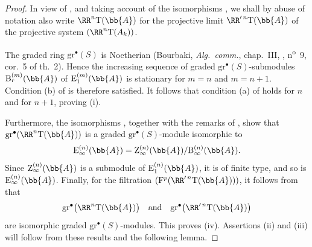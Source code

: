 \begin{proof}
In view of , and taking account of the
isomorphisms , we shall by abuse of notation also
write $\RR^n\mathrm{T}(\bb{A})$ for the projective limit
$\RR'^{\,n}\mathrm{T}(\bb{A})$ of the projective system
$(\RR^n\mathrm{T}(A_k))$.

The graded ring $\mathrm{gr}^\bullet(S)$ is Noetherian
(Bourbaki, \emph{Alg.\ comm.}, chap.~III, ,
n\textsuperscript{o}~9, cor.~5 of th.~2).
Hence the increasing sequence of graded
$\mathrm{gr}^\bullet(S)$-submodules
$\mathrm{B}_r^{(m)}(\bb{A})$ of
$\mathrm{E}_1^{(m)}(\bb{A})$ is stationary for $m=n$ and
$m=n+1$.
Condition {\rm(b)} of  is therefore satisfied.
It follows that condition {\rm(a)} of  holds for
$n$ and for $n+1$, proving {\rm(i)}.

Furthermore, the isomorphisms , together with the
remarks of , show that
$\mathrm{gr}^\bullet(\RR^n\mathrm{T}(\bb{A}))$ is a graded
$\mathrm{gr}^\bullet(S)$-module isomorphic to
\[
  \mathrm{E}_\infty^{(n)}(\bb{A})
  =
  \mathrm{Z}_\infty^{(n)}(\bb{A})
  /
  \mathrm{B}_\infty^{(n)}(\bb{A}).
\]
Since $\mathrm{Z}_\infty^{(n)}(\bb{A})$ is a submodule of
$\mathrm{E}_1^{(n)}(\bb{A})$, it is of finite type, and so is
$\mathrm{E}_\infty^{(n)}(\bb{A})$.
Finally, for the filtration
$(\mathrm{F}^p(\RR'^{\,n}\mathrm{T}(\bb{A})))$, it follows from
 that
\[
  \mathrm{gr}^\bullet\bigl(\RR^n\mathrm{T}(\bb{A})\bigr)
  \quad\hbox{and}\quad
  \mathrm{gr}^\bullet\bigl(\RR'^{\,n}\mathrm{T}(\bb{A})\bigr)
\]
are isomorphic graded $\mathrm{gr}^\bullet(S)$-modules.
This proves {\rm(iv)}.
Assertions {\rm(ii)} and {\rm(iii)} will follow from these results
and the following lemma.
\end{proof}

